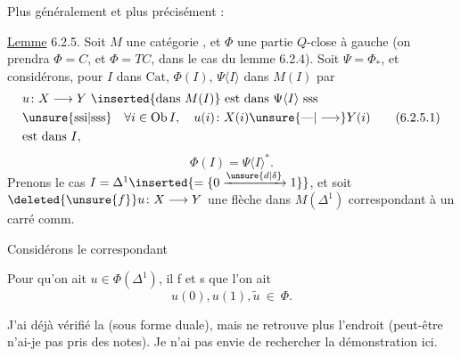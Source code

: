Plus généralement et plus précisément :

\uline{Lemme} 6.2.5. Soit $M$ une catégorie ,
et $\Phi$ une partie $Q$-close à gauche
(on prendra $\Phi=C$, et $\Phi=TC$, dans le cas
du lemme 6.2.4).  Soit
$\Psi=\Phi_*$, et considérons, pour  
$I$ dans $\mathrm{Cat}$, $\Phi(I)$, $\Psi\langle I\rangle$ dans $M(I)$
 par
\[
 \begin{aligned}
 &u\colon X\longrightarrow Y\ \inserted{\text{dans }M(I)}\ \text{est dans }\Psi\langle I\rangle\ \text{sss}\\
 &\text{\unsure{ssi|sss}}\quad \forall i\in\operatorname{Ob} I,\quad u(i)\colon X(i)\unsure{\text{---}|\longrightarrow}Y(i)\\
 &\text{est dans }I,
 \end{aligned}\tag*{(6.2.5.1)}
\]
\[
 \Phi(I)=\Psi\langle I\rangle^*.\tag*{(6.2.5.2)}
\]
Prenons le cas $I=\Delta^1\inserted{=\{0\xrightarrow{\unsure{d|\delta}}1\}}$, et soit
$\deleted{\unsure{f}}u\colon X\longrightarrow Y$ une flèche dans $M(\Delta^1)$
correspondant à un carré comm.


Considérons le  correspondant


Pour qu'on ait $u\in\Phi(\Delta^1)$, il f et s
que l'on ait
\[
 u(0),u(1),\widetilde u\ \in\ \Phi.\tag*{(6.2.5.5)}
\]

J'ai déjà vérifié la  (sous forme
duale), mais ne retrouve plus l'endroit
(peut-être n'ai-je pas pris des notes).
Je n'ai pas envie de rechercher la
démonstration ici.

